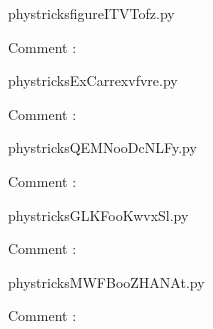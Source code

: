 
    \newcommand{\CaptionFigfigureITVTofz}{<+Type your caption here+>}
    \begin{center}
        
    \end{center}
    phystricksfigureITVTofz.py

    Comment : 

    \clearpage
    


    \newcommand{\CaptionFigExCarrexvfvre}{<+Type your caption here+>}
    \begin{center}
        
    \end{center}
    phystricksExCarrexvfvre.py

    Comment : 

    \clearpage
    


    \newcommand{\CaptionFigQEMNooDcNLFy}{<+Type your caption here+>}
    \begin{center}
        
    \end{center}
    phystricksQEMNooDcNLFy.py

    Comment : 

    \clearpage
    


    \newcommand{\CaptionFigGLKFooKwvxSl}{<+Type your caption here+>}
    \begin{center}
        
    \end{center}
    phystricksGLKFooKwvxSl.py

    Comment : 

    \clearpage
    


    \newcommand{\CaptionFigMWFBooZHANAt}{<+Type your caption here+>}
    \begin{center}
        
    \end{center}
    phystricksMWFBooZHANAt.py

    Comment : 

    \clearpage
    


